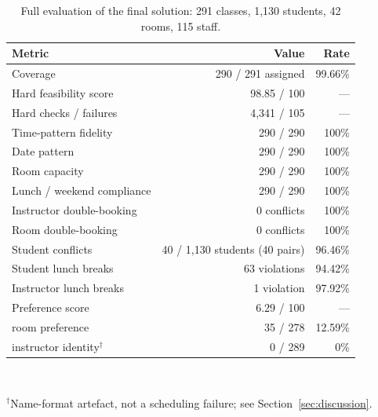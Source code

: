 \documentclass[journal]{IEEEtran}
\begin{document}
\begin{table}[t]
\centering
\caption{Full evaluation of the final solution: 291 classes, 1{,}130 students, 42 rooms, 115 staff.}
\label{tab:final}
\footnotesize
\begin{tabular}{@{}lrr@{}}
\toprule
Metric & Value & Rate \\
\midrule
Coverage & 290 / 291 assigned & 99.66\% \\
Hard feasibility score & 98.85 / 100 & --- \\
Hard checks / failures & 4{,}341 / 105 & --- \\
Time-pattern fidelity & 290 / 290 & 100\% \\
Date pattern & 290 / 290 & 100\% \\
Room capacity & 290 / 290 & 100\% \\
Lunch / weekend compliance & 290 / 290 & 100\% \\
Instructor double-booking & 0 conflicts & 100\% \\
Room double-booking & 0 conflicts & 100\% \\
Student conflicts & 40 / 1{,}130 students (40 pairs) & 96.46\% \\
Student lunch breaks & 63 violations & 94.42\% \\
Instructor lunch breaks & 1 violation & 97.92\% \\
Preference score & 6.29 / 100 & --- \\
\quad room preference & 35 / 278 & 12.59\% \\
\quad instructor identity$^{\dagger}$ & 0 / 289 & 0\% \\
\bottomrule
\end{tabular}
\\[2pt]
\raggedright\footnotesize $^{\dagger}$Name-format artefact, not a scheduling failure; see Section~\ref{sec:discussion}.
\end{table}
\end{document}
